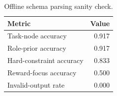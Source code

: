 \begin{table}[t]
  \centering
  \caption{Offline schema parsing sanity check.}
  \label{tab:parse_eval}
  \begin{tabular}{lr}
    \toprule
    Metric & Value \\
    \midrule
    Task-node accuracy & 0.917 \\
    Role-prior accuracy & 0.917 \\
    Hard-constraint accuracy & 0.833 \\
    Reward-focus accuracy & 0.500 \\
    Invalid-output rate & 0.000 \\
    \bottomrule
  \end{tabular}
\end{table}
